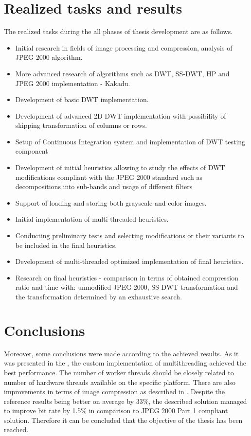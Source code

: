 \section{Realized tasks and results}

The realized tasks during the all phases of thesis development are as follows.
\begin{itemize}
    \item Initial research in fields of image processing and compression, analysis of JPEG 2000 algorithm. 
    \item More advanced research of algorithms such as DWT, SS-DWT, HP and JPEG 2000 implementation - Kakadu.
    \item Development of basic DWT implementation.
    \item Development of advanced 2D DWT implementation with possibility of skipping transformation of columns or rows.
    \item Setup of Continuous Integration system and implementation of DWT testing component 
    \item Development of initial heuristics allowing to study the effects of DWT modifications compliant
    with the JPEG 2000 standard such as decompositions into sub-bands and usage of different filters
    \item Support of loading and storing both grayscale and color images.
    \item Initial implementation of multi-threaded heuristics.
    \item Conducting preliminary tests and selecting modifications or their variants to be included in the final heuristics.
    \item Development of multi-threaded optimized implementation of final heuristics.
    \item Research on final heuristics - comparison in terms of obtained compression ratio and time with: unmodified JPEG 2000,
    SS-DWT transformation and the transformation determined by an exhaustive search.
\end{itemize}


\section{Conclusions}

Moreover, some conclusions were made according to the achieved results. As it was presented
in the , the custom implementation of multithreading achieved
the best performance. The number of worker threads should be closely related to number of
hardware threads available on the specific platform. There are also improvements in terms of
image compression as described in . Despite the reference results
being better on average by 33\%, the described solution managed to improve bit rate by 1.5\% in
comparison to JPEG 2000 Part 1 compliant solution. Therefore it can be concluded that the objective
of the thesis has been reached.


